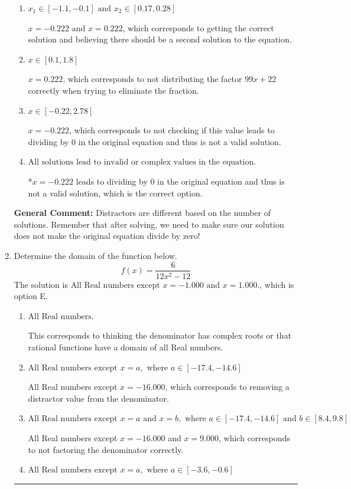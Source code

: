 \documentclass{extbook}[14pt]
\newcommand{\litem}[1]{\item #1

\rule{\textwidth}{0.4pt}}
\begin{document}
\begin{enumerate}
{\begin{enumerate}[label=\Alph*.]
$x = -0.222 \text{ and } x = -0.222$, which corresponds to getting the correct solution and believing there should be a second solution to the equation.
\item \( x_1 \in [-1.1, -0.1] \text{ and } x_2 \in [0.17,0.28] \)

$x = -0.222 \text{ and } x = 0.222$, which corresponds to getting the correct solution and believing there should be a second solution to the equation.
\item \( x \in [0.1,1.8] \)

$x = 0.222$, which corresponds to not distributing the factor $99x + 22$ correctly when trying to eliminate the fraction.
\item \( x \in [-0.22,2.78] \)

$x = -0.222$, which corresponds to not checking if this value leads to dividing by 0 in the original equation and thus is not a valid solution.
\item \( \text{All solutions lead to invalid or complex values in the equation.} \)

*$x = -0.222$ leads to dividing by 0 in the original equation and thus is not a valid solution, which is the correct option.
\end{enumerate}

\textbf{General Comment:} Distractors are different based on the number of solutions. Remember that after solving, we need to make sure our solution does not make the original equation divide by zero!
}
\litem{
Determine the domain of the function below.
\[ f(x) = \frac{6}{12x^{2} -12} \]The solution is \( \text{All Real numbers except } x = -1.000 \text{ and } x = 1.000. \), which is option E.\begin{enumerate}[label=\Alph*.]
\item \( \text{All Real numbers.} \)

This corresponds to thinking the denominator has complex roots or that rational functions have a domain of all Real numbers.
\item \( \text{All Real numbers except } x = a, \text{ where } a \in [-17.4, -14.6] \)

All Real numbers except $x = -16.000$, which corresponds to removing a distractor value from the denominator.
\item \( \text{All Real numbers except } x = a \text{ and } x = b, \text{ where } a \in [-17.4, -14.6] \text{ and } b \in [8.4, 9.8] \)

All Real numbers except $x = -16.000$ and $x = 9.000$, which corresponds to not factoring the denominator correctly.
\item \( \text{All Real numbers except } x = a, \text{ where } a \in [-3.6, -0.6] \)


\end{enumerate}}
\end{enumerate}
\end{document}
